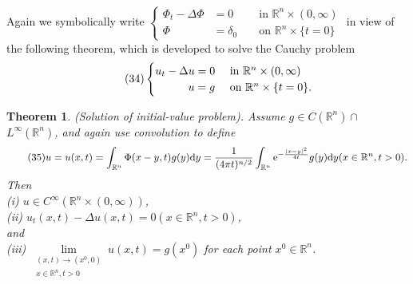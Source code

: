 \documentclass[hyperref,UTF8,12pt]{article}
\numberwithin{equation}{subsection}
\theoremstyle{plain}
\newtheorem{theorem}{Theorem}
\theoremstyle{definition}
\numberwithin{theorem}{section}
\numberwithin{lemma}{section}
\numberwithin{proposition}{section}
\numberwithin{remark}{section}
\numberwithin{corollary}{section}
\numberwithin{definition}{section}
\numberwithin{problem}{section}
\numberwithin{example}{section}
\def\e{\textup{e}}
\def\dif{\textup{d}}
\newcommand{\limls}{\lim\limits}
\newcommand{\mr}{\mathbb{R}}
\begin{document}
Again we symbolically write $\left\{\begin{aligned}\Phi_t-\Delta\Phi&=0 & & \text{ in } \mr^n\times(0,\infty)\\ \Phi&=\delta_0 & & \text{ on }\mr^n \times\{t=0\}\end{aligned}\right.$ in view of the following theorem, which is developed to solve the Cauchy problem\[\tag{34}\label{34}\begin{cases}
	\hfill u_t-\Delta u=0 & \text{ in } \mr^n\times(0,\infty)\\
	\hfill u=g&\text{ on } \mr^n\times\{t=0\}.
\end{cases}\]
\begin{theorem}\label{thm2.17}
(Solution of initial-value problem). Assume $g\in C(\mr^n)\cap$ $L^\infty(\mr^n)$, and again use convolution to define \[\tag{35}u=u(x,t)=\int_{\mr^n}\Phi(x-y,t)g(y)\dif y=\dfrac{1}{(4\pi t)^{n/2}}\int_{\mr^n}\e^{-\frac{|x-y|^2}{4t}}g(y)\dif y(x\in\mr^n, t>0).\label{35}\] Then\\
\textup{(i)} $u\in C^\infty(\mr^n\times(0,\infty))$,\\
\textup{(ii)} $u_t(x, t)-\Delta u(x,t)=0(x\in\mr^n,t>0)$,\\
and\\
\textup{(iii)} $\limls_{\substack{(x,t)\to(x^0,0)\\x\in\mr^n,t>0}}u(x,t)=g(x^0)$ for each point $x^0\in\mr^n$.
\end{theorem}
\end{document}
